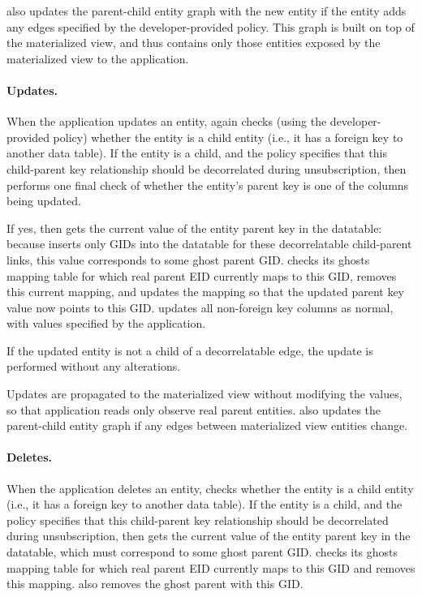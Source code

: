 \name also updates the parent-child entity graph with the new entity if the entity adds any edges
specified by the developer-provided policy. This graph is built on top of the materialized view, and
thus contains only those entities exposed by the materialized view to the application.

\paragraph{Updates.}
When the application updates an entity, \name again checks (using the developer-provided policy) whether
the entity is a child entity (i.e., it has a foreign key to another data table). 
If the entity is a child, and the policy specifies that this child-parent key
relationship should be decorrelated during unsubscription, then \name performs one final check of
whether the entity's parent key is one of the columns being updated.

If yes, then \name gets the current value of the entity parent key in the datatable: because \name
inserts only GIDs into the datatable for these decorrelatable child-parent links, this value 
corresponds to some ghost parent GID.
\name checks its ghosts mapping table for which real parent EID currently maps to this GID, removes
this current mapping, and updates the mapping so that the updated parent key value now points to
this GID.
\name updates all non-foreign key columns as normal, with values specified by the application.

If the updated entity is not a child of a decorrelatable edge, the update is performed without any
alterations.

Updates are propagated to the materialized view without modifying the values, so that application
reads only observe real parent entities.
\name also updates the parent-child entity graph if any edges between materialized view entities change.

\paragraph{Deletes.}
When the application deletes an entity, \name checks whether
the entity is a child entity (i.e., it has a foreign key to another data table). 
If the entity is a child, and the policy specifies that this child-parent key
relationship should be decorrelated during unsubscription, then \name gets the current value of the
entity parent key in the datatable, which must correspond to some ghost parent GID.
\name checks its ghosts mapping table for which real parent EID currently maps to this GID and removes
this mapping. \name also removes the ghost parent with this GID.

